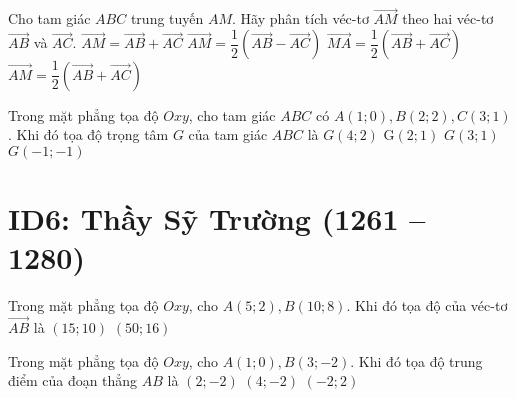 \begin{ex}%
	Cho tam giác $ABC$ trung tuyến $AM$. Hãy phân tích véc-tơ $\overrightarrow{AM}$ theo hai véc-tơ $\overrightarrow{AB} $ và $\overrightarrow{AC}$.
	\choice
	{$\overrightarrow{AM} = \overrightarrow{AB}+\overrightarrow{AC}$}
	{$\overrightarrow{AM}=\dfrac{1}{2}(\overrightarrow{AB} - \overrightarrow{AC})$}
	{$\overrightarrow{MA}=\dfrac{1}{2}(\overrightarrow{AB} + \overrightarrow{AC})$}
	{\True $\overrightarrow{AM}=\dfrac{1}{2}(\overrightarrow{AB} + \overrightarrow{AC})$}
\end{ex}

\begin{ex}%
	Trong mặt phẳng tọa độ $Oxy$, cho tam giác $ABC$ có $A(1; 0), B(2; 2), C(3; 1)$. Khi đó tọa độ trọng tâm $G$ của tam giác $ABC$ là
	\choice
	{$G(4; 2)$}
	{\True G$(2;1)$}
	{$G(3; 1)$}
	{$G(-1; -1)$}
\end{ex}



\section*{ID6: Thầy Sỹ Trường (1261 -- 1280)}
\begin{ex}%
	Trong mặt phẳng tọa độ $Oxy$, cho $A(5; 2), B(10; 8)$. Khi đó tọa độ của véc-tơ $\overrightarrow{AB}$ là
	{}
	{$(15; 10)$}
	{$(50; 16)$}
\end{ex}
\begin{ex}%
	Trong mặt phẳng tọa độ $Oxy$, cho $A(1; 0), B(3; -2)$. Khi đó tọa độ trung điểm của đoạn thẳng $AB$ là
	{$(2; -2)$}
	{$(4; -2)$}
	{$(-2; 2)$}
\end{ex}

